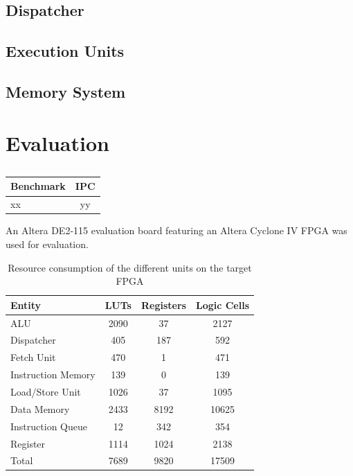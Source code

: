 \documentclass[conference]{IEEEtran}
\begin{document}
\subsection{Dispatcher}

\subsection{Execution Units}

\subsection{Memory System} \label{sec:memory}

\section{Evaluation} \label{sec:eval}




\begin{table} [h]
	\caption{}
	\centering
	\begin{tabular}{l c}
			Benchmark & IPC \\
		\midrule
			xx & yy\\
	\end{tabular}
	
	
	\label{tab:results}
\end{table}


An Altera DE2-115 evaluation board featuring an Altera Cyclone IV FPGA was used for evaluation.
\begin{table} [h]
	\caption{Resource consumption of the different units on the target FPGA}
	\centering
	\begin{tabular}{l c c c}
			Entity & LUTs & Registers & Logic Cells \\
		\midrule
			ALU & 2090 & 37 & 2127 \\
			Dispatcher & 405 & 187 & 592 \\
			Fetch Unit & 470 & 1 & 471 \\
			Instruction Memory & 139 & 0 & 139 \\
			Load/Store Unit & 1026 & 37 & 1095 \\
			Data Memory & 2433 & 8192 & 10625 \\
			Instruction Queue & 12 & 342 & 354 \\
			Register & 1114 & 1024 & 2138 \\
		\midrule
			Total & 7689 & 9820 & 17509 \\
	\end{tabular}
	
	
	\label{tab:results}
\end{table}
\end{document}
